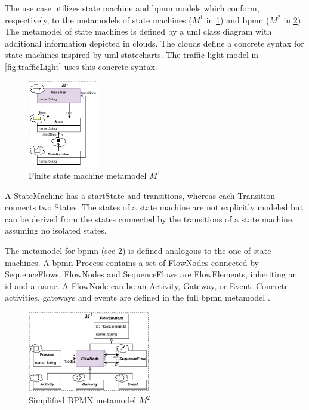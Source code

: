 \documentclass{jot}
\begin{document}
The use case utilizes state machine and \gls*{bpmn} models which conform, respectively, to the metamodels of state machines ($M^1$ in \cref{fig:fsm_metamodel}) and \gls*{bpmn} ($M^2$ in \cref{fig:bpmn_metamodel}).
The metamodel of state machines is defined by a \gls*{uml} class diagram with additional information depicted in clouds.
The clouds define a concrete syntax for state machines inspired by \gls*{uml} statecharts.
The traffic light model in \cref{fig:trafficLight} uses this concrete syntax.

\begin{figure}[h]
    \centering
    \includegraphics[width=0.275\textwidth]{figures/state_machine_metamodel.pdf}
    \caption{Finite state machine metamodel $M^1$}
    \label{fig:fsm_metamodel}
\end{figure}

A \textsf{StateMachine} has a \textsf{startState} and \textsf{transitions}, whereas each \textsf{Transition} connects two \textsf{State}s.
The states of a state machine are not explicitly modeled but can be derived from the states connected by the transitions of a state machine, assuming no isolated states.

The metamodel for \gls*{bpmn} (see \cref{fig:bpmn_metamodel}) is defined analogous to the one of state machines. 
A \gls*{bpmn} \textsf{Process} contains a set of \textsf{FlowNode}s connected by \textsf{SequenceFlow}s.
\textsf{FlowNode}s and \textsf{SequenceFlow}s are \textsf{FlowElement}s, inheriting an \textsf{id} and a \textsf{name}.
A \textsf{FlowNode} can be an \textsf{Activity}, \textsf{Gateway}, or \textsf{Event}.
Concrete activities, gateways and events are defined in the full \gls*{bpmn} metamodel \cite{objectmanagementgroupBusinessProcessModel2013}. %

\begin{figure}[h]
    \centering
    \includegraphics[width=0.475\textwidth]{figures/bpmn_metamodel.pdf}
    \caption{Simplified BPMN metamodel $M^2$ \cite{objectmanagementgroupBusinessProcessModel2013}}
    \label{fig:bpmn_metamodel}
\end{figure}
\end{document}
